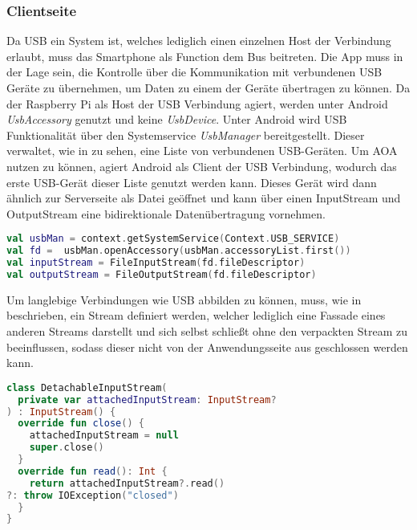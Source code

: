     \subsubsection{Clientseite}
        Da USB ein System ist, welches lediglich einen einzelnen Host der Verbindung erlaubt, muss das Smartphone als Function dem Bus beitreten. Die App muss in der Lage sein, die Kontrolle über die Kommunikation mit verbundenen USB Geräte zu übernehmen, um Daten zu einem der Geräte übertragen zu können. Da der Raspberry Pi als Host der USB Verbindung agiert, werden unter Android {\it UsbAccessory} genutzt und keine {\it UsbDevice}.
        Unter Android wird USB Funktionalität über den Systemservice {\it UsbManager} bereitgestellt. Dieser verwaltet, wie in  zu sehen, eine Liste von verbundenen USB-Geräten. Um AOA nutzen zu können, agiert Android als Client der USB Verbindung, wodurch das erste USB-Gerät dieser Liste genutzt werden kann. Dieses Gerät wird dann ähnlich zur Serverseite als Datei geöffnet und kann über einen InputStream und OutputStream eine bidirektionale Datenübertragung vornehmen.
        \begin{lstlisting}[frame=bt, label={lst:usb:client}, language=Kotlin, caption=Verbindungsaufbau über USB (Clientcode in Kotlin)]
val usbMan = context.getSystemService(Context.USB_SERVICE)
val fd =  usbMan.openAccessory(usbMan.accessoryList.first())
val inputStream = FileInputStream(fd.fileDescriptor)
val outputStream = FileOutputStream(fd.fileDescriptor)
        \end{lstlisting}

        Um langlebige Verbindungen wie USB abbilden zu können, muss, wie in  beschrieben, ein Stream definiert werden, welcher lediglich eine Fassade eines anderen Streams darstellt und sich selbst schließt ohne den verpackten Stream zu beeinflussen, sodass dieser nicht von der Anwendungsseite aus geschlossen werden kann.
\pagebreak
        \begin{lstlisting}[frame=bt, label={lst:usb:socket}, language=Kotlin, caption=Socketwrapper für USB (Clientcode in Kotlin)]
class DetachableInputStream(
  private var attachedInputStream: InputStream?
) : InputStream() {
  override fun close() {
    attachedInputStream = null
    super.close()
  }
  override fun read(): Int {
    return attachedInputStream?.read()
?: throw IOException("closed")
  }
}
        \end{lstlisting}
        
